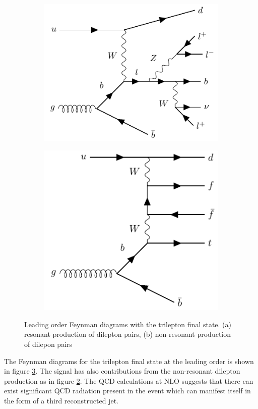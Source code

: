 \begin{figure}[h!] 
  \begin{subfigure}[b]{0.48\linewidth}
    \centering
    \includegraphics[width=0.7\linewidth]{ubonn-thesis/Chapters/Chapters_05/Figure/tZq_Zfromtop_decay.pdf} 
  \caption{}
  \label{fig:tZq-Zdecay}
  \end{subfigure}%
  \begin{subfigure}[b]{0.48\linewidth}
    \centering
    \includegraphics[width=0.7\linewidth]{ubonn-thesis/Chapters/Chapters_05/Figure/tZq_NoZ.pdf} 
  \caption{}
  \label{fig:tZq-nonZdecay}
  \end{subfigure} 
  \caption{Leading order Feynman diagrams with the trilepton final state. (a) resonant production of dilepton pairs, (b) non-resonant production of dilepon pairs }
  \label{fig:tZqdecay}
  \end{figure}


The Feynman diagrams for the trilepton final state at the leading order is shown in figure \ref{fig:tZqdecay}. The signal has also contributions from the non-resonant dilepton production as in figure \ref{fig:tZq-nonZdecay}. The QCD calculations at NLO suggests that there can exist significant QCD radiation present in the event which can manifest itself in the form of a third reconstructed jet. 

